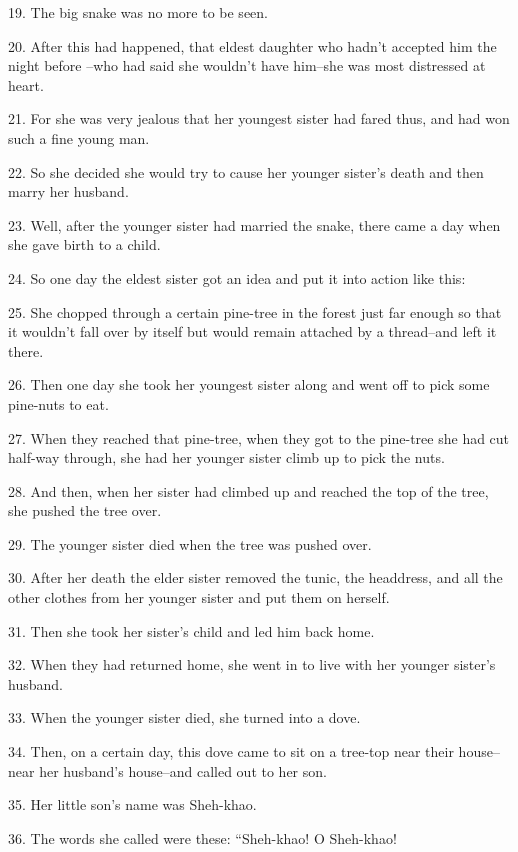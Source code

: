 {\LARGE{}19. The big snake was no more to be seen. }

{\LARGE{}20. After this had happened, that eldest daughter who hadn't accepted
him the night before --who had said she wouldn't have him--she was most distressed
at heart. }

{\LARGE{}21. For she was very jealous that her youngest sister had fared thus,
and had won such a fine young man. }

{\LARGE{}22. So she decided she would try to cause her younger sister's death and
then marry her husband. }

{\LARGE{}23. Well, after the younger sister had married the snake, there came a
day when she gave birth to a child. }

{\LARGE{}24. So one day the eldest sister got an idea and put it into action like
this: }

{\LARGE{}25. She chopped through a certain pine-tree in the forest just far enough
so that it wouldn't fall over by itself but would remain attached by a thread--and
left it there. }

{\LARGE{}26. Then one day she took her youngest sister along and went off to pick
some pine-nuts to eat. }

{\LARGE{}27. When they reached that pine-tree, when they got to the pine-tree she
had cut half-way through, she had her younger sister climb up to pick the nuts.
}

{\LARGE{}28. And then, when her sister had climbed up and reached the top of the
tree, she pushed the tree over. }

{\LARGE{}29. The younger sister died when the tree was pushed over. }

{\LARGE{}30. After her death the elder sister removed the tunic, the headdress,
and all the other clothes from her younger sister and put them on herself. }

{\LARGE{}31. Then she took her sister's child and led him back home. }

{\LARGE{}32. When they had returned home, she went in to live with her younger
sister's husband.}

{\LARGE{}33. When the younger sister died, she turned into a dove. }

{\LARGE{}34. Then, on a certain day, this dove came to sit on a tree-top near their
house--near her husband's house--and called out to her son. }

{\LARGE{}35. Her little son's name was Sheh-khao.}

{\LARGE{}36. The words she called were these: ``Sheh-khao! O Sheh-khao!
}

